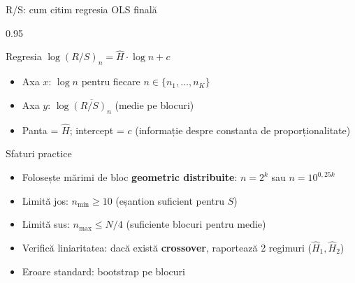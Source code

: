 \documentclass[9pt, aspectratio=169, t]{beamer}
\begin{document}
\begin{frame}[shrink=15]{R/S: cum citim regresia OLS finală}
\begin{cminipage}{0.95\textwidth}
\begin{block}{Regresia $\log(R/S)_n=\hat H\cdot\log n+c$}
\begin{itemize}\setlength{\itemsep}{0pt}
    \item Axa $x$: $\log n$ pentru fiecare $n\in\{n_1,\ldots,n_K\}$
    \item Axa $y$: $\log\overline{(R/S)_n}$ (medie pe blocuri)
    \item Panta = $\hat H$; intercept = $c$ (informație despre constanta de proporționalitate)
\end{itemize}
\end{block}
\begin{exampleblock}{Sfaturi practice}
\begin{itemize}\setlength{\itemsep}{0pt}
    \item Folosește mărimi de bloc \textbf{geometric distribuite}: $n=2^k$ sau $n=10^{0{,}25k}$
    \item Limită jos: $n_{\min}\geq 10$ (eșantion suficient pentru $S$)
    \item Limită sus: $n_{\max}\leq N/4$ (suficiente blocuri pentru medie)
    \item Verifică liniaritatea: dacă există \textbf{crossover}, raportează 2 regimuri ($\hat H_1,\hat H_2$)
    \item Eroare standard: bootstrap pe blocuri
\end{itemize}
\end{exampleblock}
\end{cminipage}
\end{frame}
\end{document}
